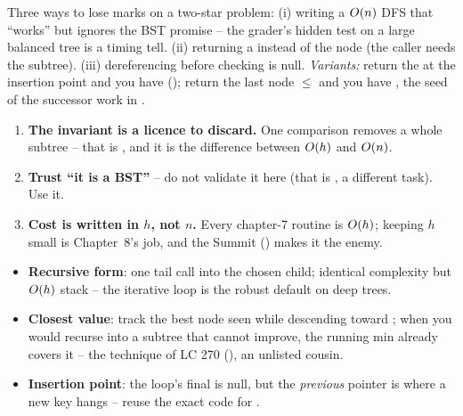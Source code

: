 
\begin{warningbox}
Three ways to lose marks on a two-star problem: (i) writing a $O(n)$ DFS that ``works'' but
ignores the BST promise -- the grader's hidden test on a large balanced tree is a timing tell.
(ii) returning a  instead of the node (the caller needs the subtree). (iii) dereferencing
 before checking  is null. \emph{Variants:} return the  at the
insertion point and you have  (); return the last node
$\le$  and you have , the seed of the successor work in .
\end{warningbox}

\begin{insightbox}
\begin{enumerate}[nosep, leftmargin=1.6em]
  \item \textbf{The invariant is a licence to discard.} One comparison removes a whole subtree --
        that is , and it is the difference between $O(h)$ and $O(n)$.
  \item \textbf{Trust ``it is a BST''} -- do not validate it here (that is , a
        different task). Use it.
  \item \textbf{Cost is written in $h$, not $n$.} Every chapter-7 routine is $O(h)$; keeping $h$
        small is Chapter~8's job, and the Summit () makes it the enemy.
\end{enumerate}
\end{insightbox}

\begin{hardeningbox}
\begin{itemize}[nosep, leftmargin=1.4em]
  \item \textbf{Recursive form}: one tail call into the chosen child; identical complexity but
        $O(h)$ stack -- the iterative loop is the robust default on deep trees.
  \item \textbf{Closest value}: track the best node seen while descending toward ; when
        you would recurse into a subtree that cannot improve, the running min already covers it --
        the technique of LC 270 (), an unlisted cousin.
  \item \textbf{Insertion point}: the loop's final  is null, but the \emph{previous}
        pointer is where a new key hangs -- reuse the exact code for .
\end{itemize}
\end{hardeningbox}


